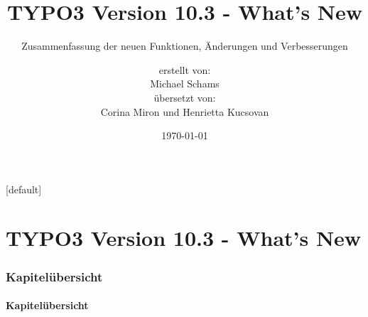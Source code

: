 \documentclass[t]{beamer}
\title{TYPO3 Version 10.3 - What's New}
\subtitle{Zusammenfassung der neuen Funktionen, Änderungen und Verbesserungen}
\author{
	\centerline{erstellt von:}
	\centerline{Michael Schams}
	\centerline{übersetzt von:}
	\centerline{Corina Miron und Henrietta Kucsovan}
}
\date{\today}
\begin{document}
\sharefont


\begingroup
	[default]
	\begin{frame}
		\titlepage
	\end{frame}
\endgroup


\section*{TYPO3 Version 10.3 - What's New}
\begin{frame}[fragile]
	\frametitle{Kapitelübersicht}
	\framesubtitle{Kapitelübersicht}

	\tableofcontents

\end{frame}











%

\end{document}
